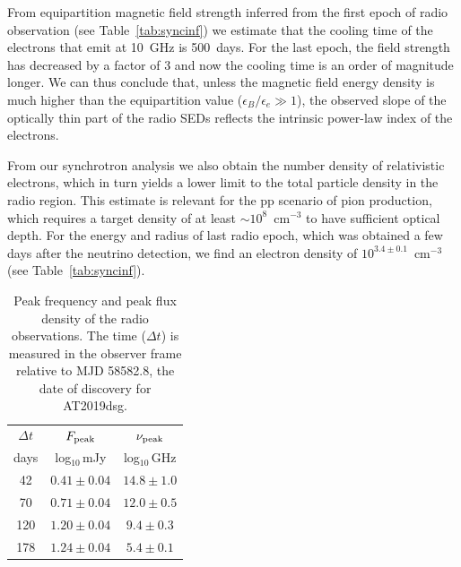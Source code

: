 \documentclass{nature_plusfigure}
\begin{document}
\begin{methods}
From equipartition magnetic field strength inferred from the first epoch of radio observation (see Table~\ref{tab:syncinf}) we estimate that the cooling time of the electrons that emit at 10~GHz is 500~days. For the last epoch, the field strength has decreased by a factor of 3 and now the cooling time is an order of magnitude longer. We can thus conclude that, unless the magnetic field energy density is much higher than the equipartition value ($\epsilon_B/\epsilon_e\gg1$), the observed slope of the optically thin part of the radio SEDs reflects the intrinsic power-law index of the electrons. 

From our synchrotron analysis we also obtain the number density of relativistic electrons, which in  turn yields a lower limit to the total particle density in the radio region. This estimate is relevant for the pp scenario of pion production, which requires a target density of at least $\sim 10^8$~cm$^{-3}$ to have sufficient optical depth. For the energy and radius of last radio epoch, which was obtained a few days after the neutrino detection, we find an electron density of $10^{3.4\pm 0.1}$~cm$^{-3}$ (see Table~\ref{tab:syncinf}).

\begin{table}
\centering
\begin{tabular}{|c | c c |}
\hline
$\Delta t$ & $F_{\rm peak}$ & $\nu_{\rm peak}$ \\ 
 days & log$_{10}$\,mJy &  log$_{10}$\,GHz  \\
 \hline
 \hline
  42 & $ 0.41\pm0.04$ & $ 14.8\pm1.0$ \\ 
  70 & $ 0.71\pm0.04$ & $ 12.0\pm0.5$ \\ 
 120 & $ 1.20\pm0.04$ & $  9.4\pm0.3$ \\ 
 178 & $ 1.24\pm0.04$ & $  5.4\pm0.1$ \\ 
 \hline
\end{tabular}
\caption{Peak frequency and peak flux density of the radio observations. The time ($\Delta t$) is measured in the observer frame relative to MJD 58582.8, the date of discovery for AT2019dsg.}
\label{tab:syncobs}
\end{table}


\end{methods}
\end{document}
